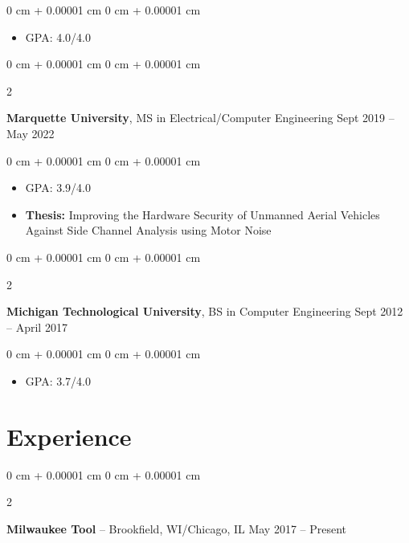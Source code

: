 \documentclass[10pt, letterpaper]{article}
\newenvironment{highlights}{
    \begin{itemize}[
        topsep=0.10 cm,
        parsep=0.10 cm,
        partopsep=0pt,
        itemsep=0pt,
        leftmargin=0 cm + 10pt
    ]
}{
    \end{itemize}
} %
\newenvironment{onecolentry}{
    \begin{adjustwidth}{
        0 cm + 0.00001 cm
    }{
        0 cm + 0.00001 cm
    }
}{
    \end{adjustwidth}
} %
\newenvironment{twocolentry}[2][]{
    \onecolentry
    \def\secondColumn{#2}
    \setcolumnwidth{\fill, 4.5 cm}
    \begin{paracol}{2}
}{
    \switchcolumn \raggedleft \secondColumn
    \end{paracol}
    \endonecolentry
} %
\begin{document}
        \vspace{0.10 cm}
        \begin{onecolentry}
            \begin{highlights}
                \item GPA: 4.0/4.0 
            \end{highlights}
        \end{onecolentry}
        \vspace{0.2 cm}
        \begin{twocolentry}{
            Sept 2019 – May 2022
        }
            \textbf{Marquette University}, MS in Electrical/Computer Engineering\end{twocolentry}

        \vspace{0.10 cm}
        \begin{onecolentry}
            \begin{highlights}
                \item GPA: 3.9/4.0 
                \item \textbf{Thesis:} Improving the Hardware Security of Unmanned Aerial Vehicles Against Side Channel Analysis using Motor Noise 
            \end{highlights}
        \end{onecolentry}
        \vspace{0.2 cm}
        \begin{twocolentry}{
            Sept 2012 – April 2017
        }
            \textbf{Michigan Technological University}, BS in Computer Engineering\end{twocolentry}

        \vspace{0.10 cm}
        \begin{onecolentry}
            \begin{highlights}
                \item GPA: 3.7/4.0 
            \end{highlights}
        \end{onecolentry}
    
    \section{Experience}
        
        \begin{twocolentry}{
            May 2017 – Present
        }
            \textbf{Milwaukee Tool} -- Brookfield, WI/Chicago, IL\end{twocolentry}
\end{document}
